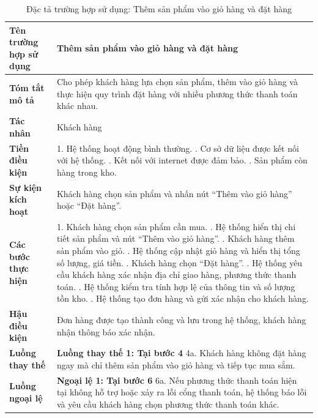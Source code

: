 \begin{longtable}{|>{\bfseries}p{4cm}|p{11.5cm}|}
\caption{Đặc tả trường hợp sử dụng: Thêm sản phẩm vào giỏ hàng và đặt hàng}
\label{tab:uc-add-to-cart-checkout} \\
\hline
\textbf{Tên trường hợp sử dụng} & Thêm sản phẩm vào giỏ hàng và đặt hàng \\
\hline
\textbf{Tóm tắt mô tả} & Cho phép khách hàng lựa chọn sản phẩm, thêm vào giỏ hàng và thực hiện quy trình đặt hàng với nhiều phương thức thanh toán khác nhau. \\
\hline
\textbf{Tác nhân} & Khách hàng \\
\hline
\textbf{Tiền điều kiện} & 1. Hệ thống hoạt động bình thường. \newline
2. Cơ sở dữ liệu được kết nối với hệ thống. \newline
3. Kết nối với internet được đảm bảo. \newline
4. Sản phẩm còn hàng trong kho. \\
\hline
\textbf{Sự kiện kích hoạt} & Khách hàng chọn sản phẩm và nhấn nút “Thêm vào giỏ hàng” hoặc “Đặt hàng”. \\
\hline
\textbf{Các bước thực hiện} & 1. Khách hàng chọn sản phẩm cần mua. \newline
2. Hệ thống hiển thị chi tiết sản phẩm và nút “Thêm vào giỏ hàng”. \newline
3. Khách hàng thêm sản phẩm vào giỏ. \newline
4. Hệ thống cập nhật giỏ hàng và hiển thị tổng số lượng, giá tiền. \newline
5. Khách hàng chọn “Đặt hàng”. \newline
6. Hệ thống yêu cầu khách hàng xác nhận địa chỉ giao hàng, phương thức thanh toán. \newline
7. Hệ thống kiểm tra tính hợp lệ của thông tin và số lượng tồn kho. \newline
8. Hệ thống tạo đơn hàng và gửi xác nhận cho khách hàng. \\
\hline
\textbf{Hậu điều kiện} & Đơn hàng được tạo thành công và lưu trong hệ thống, khách hàng nhận thông báo xác nhận. \\
\hline
\textbf{Luồng thay thế} & \textbf{Luồng thay thế 1: Tại bước 4} \newline
4a. Khách hàng không đặt hàng ngay mà chỉ thêm sản phẩm vào giỏ hàng và tiếp tục mua sắm. \\
\hline
\textbf{Luồng ngoại lệ} & \textbf{Ngoại lệ 1: Tại bước 6} \newline
6a. Nếu phương thức thanh toán hiện tại không hỗ trợ hoặc xảy ra lỗi cổng thanh toán, hệ thống báo lỗi và yêu cầu khách hàng chọn phương thức thanh toán khác. \\
\hline
\end{longtable}

